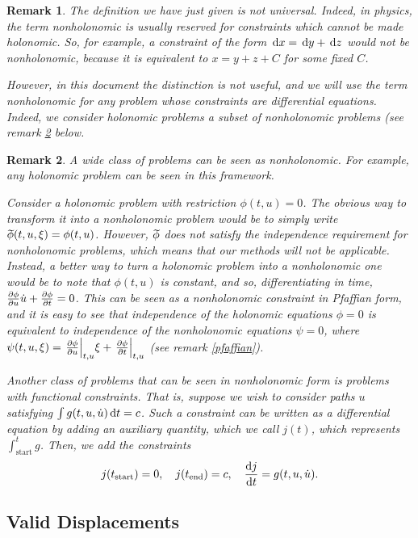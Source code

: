 \documentclass{article}
\theoremstyle{plain}
\theoremstyle{plain}
\newtheorem{remark}{Remark}
\theoremstyle{nonumberplain}
\theoremstyle{empty}
\newcommand{\tstart}{\mathrm{start}}
\newcommand{\tend}{\mathrm{end}}
\newcommand{\wtphi}{
  \mspace{2mu}
  \widetilde{\mspace{-2mu}\smash[t]{\phi}}
}
\DeclarePairedDelimiter\eval{.}{\rvert}
\begin{document}
\begin{remark}
The definition we have just given is not universal. Indeed, in physics, the term nonholonomic is usually reserved for constraints which \emph{cannot} be made holonomic. So, for example, a constraint of the form $\dl x = \dl y + \dl z$ would not be nonholonomic, because it is equivalent to $x = y + z + C$ for some fixed $C$.

However, in this document the distinction is not useful, and we will use the term nonholonomic for any problem whose constraints are differential equations. Indeed, we consider holonomic problems a subset of nonholonomic problems (see remark \ref{nonholoaregeneral} below.
\end{remark}

\begin{remark}\label{nonholoaregeneral}
A wide class of problems can be seen as nonholonomic. For example, any holonomic problem can be seen in this framework.

Consider a holonomic problem with restriction $\phi(t,u) = 0$. The obvious way to transform it into a nonholonomic problem would be to simply write $\wtphi(t,u,\xi) = \phi(t,u)$. However, $\wtphi$ does not satisfy the independence requirement for nonholonomic problems, which means that our methods will not be applicable. Instead, a better way to turn a holonomic problem into a nonholonomic one would be to note that $\phi(t,u)$ is constant, and so, differentiating in time, $\diffp \phi u \dot u + \diffp \phi t = 0$. This can be seen as a nonholonomic constraint in Pfaffian form, and it is easy to see that independence of the holonomic equations $\phi = 0$ is equivalent to independence of the nonholonomic equations $\psi = 0$, where $\psi(t,u,\xi) = \eval*{\diffp \phi u}_{t,u} \xi + \eval*{\diffp \phi t}_{t,u}$ (see remark \ref{pfaffian}).

Another class of problems that can be seen in nonholonomic form is problems with functional constraints. That is, suppose we wish to consider paths $u$ satisfying $\int g(t,u,\dot u) \dl t = c$. Such a constraint can be written as a differential equation by adding an auxiliary quantity, which we call $j(t)$, which represents $\int_\tstart^t g$. Then, we add the constraints
\[j(t_\tstart) = 0, \quad j(t_\tend) = c, \quad \diff j t = g(t,u,\dot u).\]
\end{remark}

\subsection{Valid Displacements}\label{validdisplacements}
\end{document}
